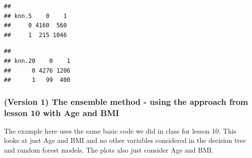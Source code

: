 \documentclass[]{article}
\newenvironment{Shaded}{\begin{snugshade}}{\end{snugshade}}
\newcommand{\KeywordTok}[1]{\textcolor[rgb]{0.13,0.29,0.53}{\textbf{{#1}}}}
\newcommand{\DataTypeTok}[1]{\textcolor[rgb]{0.13,0.29,0.53}{{#1}}}
\newcommand{\DecValTok}[1]{\textcolor[rgb]{0.00,0.00,0.81}{{#1}}}
\newcommand{\FloatTok}[1]{\textcolor[rgb]{0.00,0.00,0.81}{{#1}}}
\newcommand{\StringTok}[1]{\textcolor[rgb]{0.31,0.60,0.02}{{#1}}}
\newcommand{\CommentTok}[1]{\textcolor[rgb]{0.56,0.35,0.01}{\textit{{#1}}}}
\newcommand{\NormalTok}[1]{{#1}}
\begin{document}
\begin{Shaded}
\end{Shaded}

\begin{verbatim}
##      
## knn.5    0    1
##     0 4160  560
##     1  215 1046
\end{verbatim}

\begin{Shaded}
\end{Shaded}

\begin{verbatim}
##       
## knn.20    0    1
##      0 4276 1206
##      1   99  400
\end{verbatim}

\subsubsection{(Version 1) The ensemble method - using the approach from
lesson 10 with Age and
BMI}\label{version-1-the-ensemble-method---using-the-approach-from-lesson-10-with-age-and-bmi}

The example here uses the same basic code we did in class for lesson 10.
This looks at just Age and BMI and no other variables considered in the
decision tree and random forest models. The plots also just consider Age
and BMI.

\begin{Shaded}
\end{Shaded}
\end{document}
